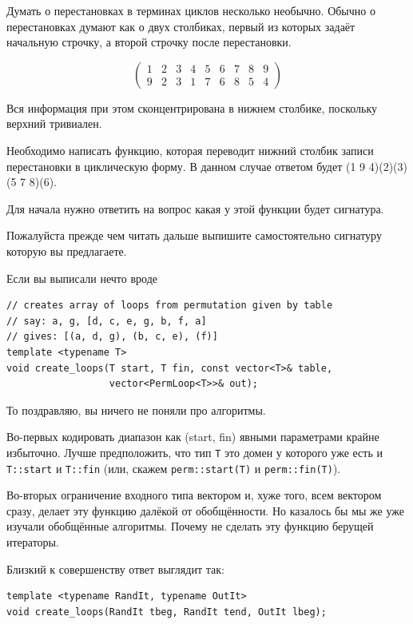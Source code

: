\documentclass[a4paper,12pt,oneside]{book}
\begin{document}
Думать о перестановках в терминах циклов несколько необычно. Обычно о перестановках думают как о двух столбиках, первый из которых задаёт начальную строчку, а второй строчку после перестановки.

\[
  \left(\begin{matrix}
    1 & 2 & 3 & 4 & 5 & 6 & 7 & 8 & 9  \\
    9 & 2 & 3 & 1 & 7 & 6 & 8 & 5 & 4
  \end{matrix}\right)
\]

Вся информация при этом сконцентрирована в нижнем столбике, поскольку верхний тривиален.

Необходимо написать функцию, которая переводит нижний столбик записи перестановки в циклическую форму. В данном случае ответом будет (1 9 4)(2)(3)(5 7 8)(6).

Для начала нужно ответить на вопрос какая у этой функции будет сигнатура.

Пожалуйста прежде чем читать дальше выпишите самостоятельно сигнатуру которую вы предлагаете.

Если вы выписали нечто вроде

\begin{lstlisting}
// creates array of loops from permutation given by table
// say: a, g, [d, c, e, g, b, f, a]
// gives: [(a, d, g), (b, c, e), (f)]
template <typename T>
void create_loops(T start, T fin, const vector<T>& table,
                  vector<PermLoop<T>>& out);
\end{lstlisting}

То поздравляю, вы ничего не поняли про алгоритмы.

Во-первых кодировать диапазон как (start, fin) явными параметрами крайне избыточно. Лучше предположить, что тип \lstinline!T! это домен у которого уже есть и \lstinline!T::start! и \lstinline!T::fin! (или, скажем \lstinline!perm::start(T)! и \lstinline!perm::fin(T)!).

Во-вторых ограничение входного типа вектором и, хуже того, всем вектором сразу, делает эту функцию далёкой от обобщённости. Но казалось бы мы же уже изучали обобщённые алгоритмы. Почему не сделать эту функцию берущей итераторы.

Близкий к совершенству ответ выглядит так:

\begin{lstlisting}
template <typename RandIt, typename OutIt>
void create_loops(RandIt tbeg, RandIt tend, OutIt lbeg);
\end{lstlisting}
\end{document}
